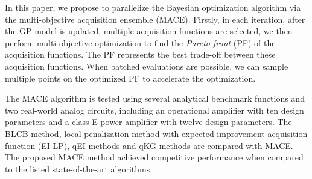 In this paper, we propose to parallelize the Bayesian optimization algorithm
via the multi-objective acquisition ensemble (MACE). Firstly, in each
iteration, after the GP model is updated, multiple acquisition functions are
selected, we then perform multi-objective optimization to find the \emph{Pareto
front} (PF) of the acquisition functions. The PF represents the best trade-off
between these acquisition functions. When batched evaluations are possible, we
can sample multiple points on the optimized PF to accelerate the optimization.

The MACE algorithm is tested using several analytical benchmark functions and
two real-world analog circuits, including an operational amplifier with ten
design parameters and a class-E power amplifier with twelve design parameters.
The BLCB method, local penalization method with expected improvement
acquisition function (EI-LP), qEI methods and qKG methods are compared with
MACE. The proposed MACE method achieved competitive performance when compared
to the listed state-of-the-art algorithms.
